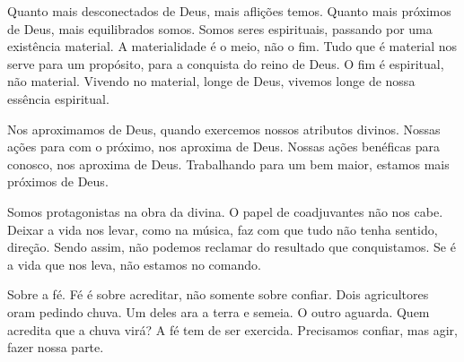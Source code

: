 \emdash{}Quanto mais desconectados de Deus, mais aflições temos. Quanto mais próximos de Deus, mais equilibrados somos. Somos seres espirituais, passando por uma existência material. A materialidade é o meio, não o fim. Tudo que é material nos serve para um propósito, para a conquista do reino de Deus. O fim é espiritual, não material. Vivendo no material, longe de Deus, vivemos longe de nossa essência espiritual.

\emdash{}Nos aproximamos de Deus, quando exercemos nossos atributos divinos. Nossas ações para com o próximo, nos aproxima de Deus. Nossas ações benéficas para conosco, nos aproxima de Deus. Trabalhando para um bem maior, estamos mais próximos de Deus.

\emdash{}Somos protagonistas na obra da divina. O papel de coadjuvantes não nos cabe. Deixar a vida nos levar, como na música, faz com que tudo não tenha sentido, direção. Sendo assim, não podemos reclamar do resultado que conquistamos. Se é a vida que nos leva, não estamos no comando.

\emdash{}Sobre a fé. Fé é sobre acreditar, não somente sobre confiar. Dois agricultores oram pedindo chuva. Um deles ara a terra e semeia. O outro aguarda. Quem acredita que a chuva virá? A fé tem de ser exercida. Precisamos confiar, mas agir, fazer nossa parte.

